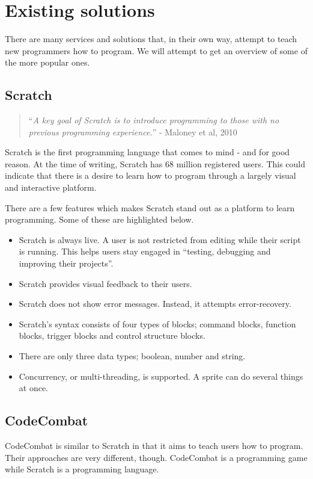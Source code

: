 \section{Existing solutions}\label{sec:existing_solutions}
There are many services and solutions that, in their own way, attempt to teach new programmers how to program.
We will attempt to get an overview of some of the more popular ones.

\subsection{Scratch}\label{ScratchSection}
\begin{quote}
    ``\emph{A key goal of Scratch is to introduce programming to those with no previous programming experience.}'' - Maloney et al, 2010\cite{maloneyScratchProgrammingLanguage2010}
\end{quote}

Scratch\cite{ScratchImagineProgram} is the first programming language that comes to mind - and for good reason. At the time of writing, Scratch has 68 million registered users\cite{ScratchImagineProgramStatistics}. This could indicate that there is a desire to learn how to program through a largely visual and interactive platform.

There are a few features which makes Scratch stand out as a platform to learn programming. Some of these are highlighted below.
\begin{itemize}
    \item Scratch is always live. A user is not restricted from editing while their script is running. This helps users stay engaged in ``testing, debugging and improving their projects''.
    \item Scratch provides visual feedback to their users.
    \item Scratch does not show error messages. Instead, it attempts error-recovery.
    \item Scratch's syntax consists of four types of blocks; command blocks, function blocks, trigger blocks and control structure blocks.
    \item There are only three data types; boolean, number and string.
    \item Concurrency, or multi-threading, is supported. A sprite can do several things at once.
\end{itemize}\cite{maloneyScratchProgrammingLanguage2010}

\subsection{CodeCombat}\label{CodeCombatSection}
CodeCombat\cite{CodeCombatCodingGames} is similar to Scratch in that it aims to teach users how to program.
Their approaches are very different, though. CodeCombat is a programming game while Scratch is a programming language.

